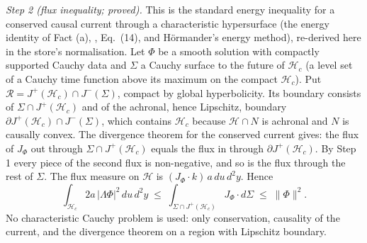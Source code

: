 \emph{Step 2 (flux inequality; proved).} This is the standard energy inequality for a conserved causal current through a characteristic hypersurface (the energy identity of Fact (a), \cite{HafnerNicolas2011}, Eq.~(14), and Hörmander's energy method), re-derived here in the store's normalisation. Let $\Phi$ be a smooth solution with compactly supported Cauchy data and $\Sigma$ a Cauchy surface to the future of $\mathcal{H}_{c}$ (a level set of a Cauchy time function above its maximum on the compact $\mathcal{H}_{c}$). Put $\mathcal{R} = J^{+}(\mathcal{H}_{c})\cap J^{-}(\Sigma)$, compact by global hyperbolicity. Its boundary consists of $\Sigma\cap J^{+}(\mathcal{H}_{c})$ and of the achronal, hence Lipschitz, boundary $\partial J^{+}(\mathcal{H}_{c})\cap J^{-}(\Sigma)$, which contains $\mathcal{H}_{c}$ because $\mathcal{H}\cap N$ is achronal and $N$ is causally convex. The divergence theorem for the conserved current gives: the flux of $J_{\Phi}$ out through $\Sigma\cap J^{+}(\mathcal{H}_{c})$ equals the flux in through $\partial J^{+}(\mathcal{H}_{c})$. By Step 1 every piece of the second flux is non-negative, and so is the flux through the rest of $\Sigma$. The flux measure on $\mathcal{H}$ is $(J_{\Phi}\cdot k)\,a\,du\,d^{2}y$. Hence
\[
\int_{\mathcal{H}_{c}} 2a\,|\Lambda\Phi|^{2}\,du\,d^{2}y \;\le\; \int_{\Sigma\cap J^{+}(\mathcal{H}_{c})} J_{\Phi}\cdot d\Sigma \;\le\; \|\Phi\|^{2}.
\]
No characteristic Cauchy problem is used: only conservation, causality of the current, and the divergence theorem on a region with Lipschitz boundary.

